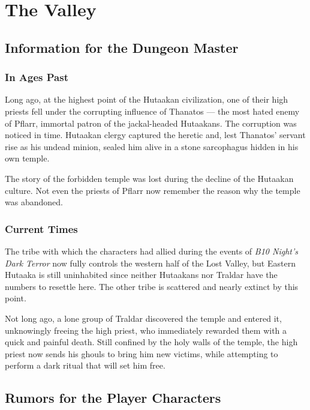 \documentclass[english,11pt,openany,letterpaper,twocolumn]{book}
\begin{document}
\chapter{The Valley}
\label{ch:valley}

\section{Information for the Dungeon Master}

\subsection{In Ages Past}

Long ago, at the highest point of the Hutaakan civilization, one of their high priests fell under the corrupting influence of Thanatos --- the most hated enemy of Pflarr, immortal patron of the jackal-headed Hutaakans. The corruption was noticed in time. Hutaakan clergy captured the heretic and, lest Thanatos' servant rise as his undead minion, sealed him alive in a stone sarcophagus hidden in his own temple.

\tab The story of the forbidden temple was lost during the decline of the Hutaakan culture. Not even the priests of Pflarr now remember the reason why the temple was abandoned.

\subsection{Current Times}

\tab The tribe with which the characters had allied during the events of \emph{B10 Night's Dark Terror} now fully controls the western half of the Lost Valley, but Eastern Hutaaka is still uninhabited since neither Hutaakans nor Traldar have the numbers to resettle here. The other tribe is scattered and nearly extinct by this point.

\tab Not long ago, a lone group of Traldar discovered the temple and entered it, unknowingly freeing the high priest, who immediately rewarded them with a quick and painful death. Still confined by the holy walls of the temple, the high priest now sends his ghouls to bring him new victims, while attempting to perform a dark ritual that will set him free.

\break

\section{Rumors for the Player Characters}
\end{document}
